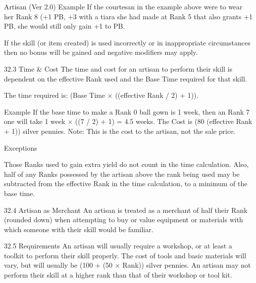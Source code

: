 \begin{Chapter}{Artisan (Ver 2.0)}
Example  
If the courtesan in the example above were 
to wear her Rank 8 (+1 PB, +3%
with a tiara she had made at Rank 5 that also grants +1 PB, 
she would still only gain +1 to PB. 

If  the  skill  (or  item  created)  is  used  incorrectly  or 
in  inappropriate  circumstances  then  no  bonus  will 
be gained and negative modifiers may apply. 

32.3 Time \& Cost 
The  time  and  cost  for  an  artisan  to  perform  their 
skill  is  dependent  on  the  effective  Rank  used  and 
the Base Time required for that skill. 

The  time  required  is:  (Base  Time  ×  ((effective 
Rank / 2) + 1)). 

Example 
If  the  base  time  to  make  a  Rank  0  ball 
gown is 1 week, then an Rank 7 one will take 1 week × ((7 
/  2)  +  1)  =  4.5  weeks.  The  Cost  is  (80%
(effective Rank + 1)) silver pennies. Note: This is the cost 
to the artisan, not the sale price. 

Exceptions 

Those Ranks used to gain extra yield do not count 
in  the  time  calculation.  Also,  half  of  any  Ranks 
possessed by the artisan above the rank being used 
may  be  subtracted  from  the  effective  Rank  in  the 
time calculation, to a minimum of the base time. 

32.4 Artisan as Merchant 
An  artisan  is  treated  as  a  merchant  of  half  their 
Rank  (rounded  down)  when  attempting  to  buy  or 
value equipment or materials with which someone 
with their skill would be familiar. 

32.5 Requirements 
An  artisan  will  usually  require  a  workshop,  or  at 
least  a  toolkit  to  perform  their  skill  properly.  The 
cost of tools and basic materials will vary, but will 
usually be (100 + (50 × Rank)) silver pennies. An 
artisan may not perform their skill at a higher rank 
than that of their workshop or tool kit. 

\end{Chapter}
